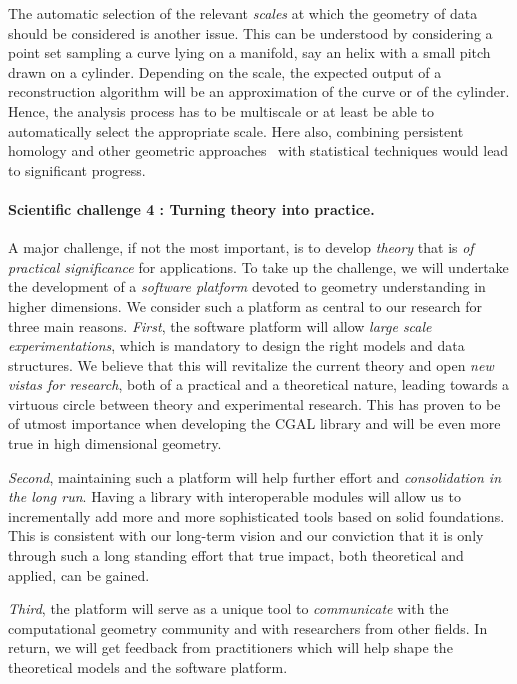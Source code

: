 The automatic selection of the relevant {\em scales} at which the geometry of data should be considered is another issue.  This can be understood by considering a point set sampling a curve lying on a manifold, say an helix with a small pitch drawn on a cylinder. Depending on the scale, the expected output of a reconstruction algorithm will be an approximation of the curve or of the cylinder. Hence, the analysis process has to be multiscale or at least be able to automatically select the appropriate scale.  Here also, combining persistent homology and other geometric approaches~\cite{geometrica-bgo-09} with statistical techniques would lead to significant progress.

\paragraph{Scientific challenge 4 : Turning theory into practice.}
A major challenge, if not the most important, is to develop {\em theory} that is {\em of practical significance} for applications.   To take up the challenge, we will %
undertake the development of a {\em software platform} devoted to geometry understanding in higher dimensions. 
We consider such a platform as central to our research  for three main reasons.  {\em First}, the software platform will allow {\em large scale experimentations}, which is mandatory to design the right models and data structures. We believe that this will revitalize the current theory and open {\em new vistas for research}, both of a practical and a theoretical nature, leading towards a virtuous circle between theory and experimental research. This has proven to be of utmost importance
when developing the CGAL library and will be even more true in high dimensional geometry.

{\em Second}, maintaining such a platform will help further effort and {\em consolidation in the long run}.  Having a library with interoperable modules will allow us to incrementally add more and more sophisticated tools based on solid foundations.  This is consistent with our long-term vision and our conviction that it is only through such a long standing effort that true impact, both theoretical and applied, can be gained.

{\em Third}, the platform will serve as a unique tool to {\em communicate} with the computational geometry community and with researchers from other fields. 
 In return, we will get feedback from practitioners which will help shape the theoretical models and the software platform.

